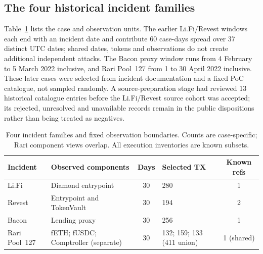 \documentclass[preprint,12pt,authoryear]{elsarticle}
\begin{document}
\subsection{The four historical incident families}
Table~\ref{tab:cohort} lists the case and observation units. The earlier Li.Fi/Revest windows each end with an incident date and contribute 60 case-days spread over 37 distinct UTC dates; shared dates, tokens and observations do not create additional independent attacks. The Bacon proxy window runs from 4 February to 5 March 2022 inclusive, and Rari Pool~127 from 1 to 30 April 2022 inclusive. These later cases were selected from incident documentation and a fixed PoC catalogue, not sampled randomly. A source-preparation stage had reviewed 13 historical catalogue entries before the Li.Fi/Revest source cohort was accepted; its rejected, unresolved and unavailable records remain in the public dispositions rather than being treated as negatives.

\begin{table}[htbp]
\centering\footnotesize
\caption{Four incident families and fixed observation boundaries. Counts are case-specific; Rari component views overlap. All execution inventories are known subsets.}
\label{tab:cohort}
\begin{tabular}{p{1.8cm}p{3.35cm}c p{2.7cm}c}
\toprule
Incident & Observed components & Days & Selected TX & Known refs \\
\midrule
Li.Fi & Diamond entrypoint & 30 & 280 & 1 \\
Revest & Entrypoint and TokenVault & 30 & 194 & 2 \\
Bacon & Lending proxy & 30 & 256 & 1 \\
Rari Pool~127 & fETH; fUSDC; Comptroller (separate) & 30 & 132; 159; 133 (411 union) & 1 (shared) \\
\bottomrule
\end{tabular}
\end{table}
\end{document}
